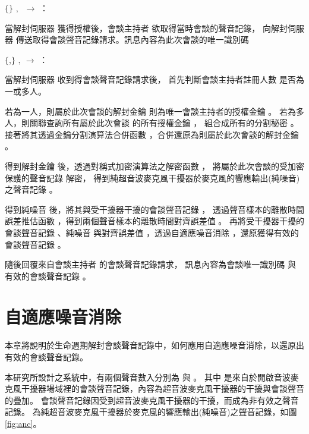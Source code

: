 \begin{pmsgs}
    \item $\{$\DEFsessionID$\}$ $,~$ \DEFowner $\rightarrow$ \DEFserver：

        當解封伺服器 \DEFserver 獲得授權後，會談主持者 \DEFowner 欲取得當時會談的聲音記錄，
    向解封伺服器 \DEFserver 傳送取得會談聲音記錄請求。訊息內容為此次會談的唯一識別碼 \DEFsessionID

    \item $\{$\DEFsessionID,\DEFrecREV$\}$ $,~$\DEFserver $\rightarrow$ \DEFowner：

        當解封伺服器 \DEFserver 收到得會談聲音記錄請求後，
    首先判斷會談主持者註冊人數 \DEFowreg 是否為一或多人。

        若為一人，則屬於此次會談的解封金鑰 \DEFunsealKey 則為唯一會談主持者的授權金鑰 \DEFagentKey。
    若為多人，則關聯查詢所有屬於此次會談 \DEFownerAll 的所有授權金鑰 \DEFagentKey，
    組合成所有的分割秘密 \DEFsharesAll。
    接著將其透過金鑰分割演算法合併函數 \DEFfuncSSC{}，合併還原為則屬於此次會談的解封金鑰 \DEFunsealKey。

        得到解封金鑰 \DEFunsealKey 後，透過對稱式加密演算法之解密函數 \DEFfuncDecEK{}，
    將屬於此次會談的受加密保護的聲音記錄 \DEFrecP 解密，
    得到純超音波麥克風干擾器於麥克風的響應輸出(純噪音)之聲音記錄 \DEFrecN。

        得到純噪音 \DEFrecN 後，將其與受干擾器干擾的會談聲音記錄 \DEFrecJ，
    透過聲音樣本的離散時間誤差推估函數 \DEFfuncEstm{}，得到兩個聲音樣本的離散時間對齊誤差值 \DEFshift。
    再將受干擾器干擾的會談聲音記錄 \DEFrecJ、純噪音 \DEFrecN
    與對齊誤差值 \DEFshift，透過自適應噪音消除 \DEFfuncAnc{}，還原獲得有效的會談聲音記錄 \DEFrecREV。

        隨後回覆來自會談主持者 \DEFowner 的會談聲音記錄請求，
    訊息內容為會談唯一識別碼 \DEFsessionID 與 有效的會談聲音記錄 \DEFrecREV。
\end{pmsgs}


\section{自適應噪音消除}\label{sec:anc}

    本章將說明於生命週期解封會談聲音記錄中，如何應用自適應噪音消除，以還原出有效的會談聲音記錄。

    本研究所設計之系統中，有兩個聲音數入分別為 \DEFrecJ 與 \DEFrecN。
其中 \DEFrecJ 是來自於開啟音波麥克風干擾器場域裡的會談聲音記錄，內容為超音波麥克風干擾器的干擾與會談聲音的疊加。
會談聲音記錄因受到超音波麥克風干擾器的干擾，而成為非有效之聲音記錄。
\DEFrecN 為純超音波麥克風干擾器於麥克風的響應輸出(純噪音)之聲音記錄，如圖 \ref{fig:anc}。

